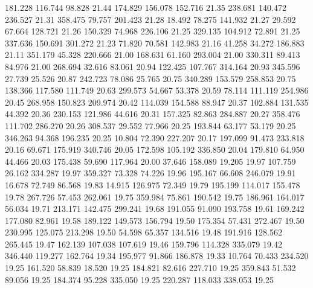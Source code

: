  181.228  116.744   98.828        21.44
 174.829  156.078  152.716        21.35
 238.681  140.472  236.527        21.31
 358.475   79.757  201.423        21.28
  18.492   78.275  141.932        21.27
  29.592   67.664  128.721        21.26
 150.329   74.968  226.106        21.25
 329.135  104.912   72.891        21.25
 337.636  150.691  301.272        21.23
  71.820   70.581  142.983        21.16
  41.258   34.272  186.883        21.11
 351.179   45.328  220.666        21.00
 168.631   61.160  293.004        21.00
 330.311   89.413   84.976        21.00
 268.694   32.616   83.061        20.94
 122.425  107.767  314.164        20.93
 345.596   27.739   25.526        20.87
 242.723   78.086   25.765        20.75
 340.289  153.579  258.853        20.75
 138.366  117.580  111.749        20.63
 299.573   54.667   53.378        20.59
  78.114  111.119  254.986        20.45
 268.958  150.823  209.974        20.42
 114.039  154.588   88.947        20.37
 102.884  131.535   44.392        20.36
 230.153  121.986   44.616        20.31
 157.325   82.863  284.887        20.27
 358.476  111.702  286.270        20.26
 308.537   29.552   77.966        20.25
 193.844   63.177   53.179        20.25
 346.263   94.368  196.235        20.25
  10.804   72.390  227.207        20.17
 197.099   91.473  233.818        20.16
  69.671  175.919  340.746        20.05
 172.598  105.192  336.850        20.04
 179.810   64.950   44.466        20.03
 175.438   59.690  117.964        20.00
  37.646  158.089   19.205        19.97
 107.759   26.162  334.287        19.97
 359.327   73.328   74.226        19.96
 195.167   66.608  246.079        19.91
  16.678   72.749   86.568        19.83
  14.915  126.975   72.349        19.79
 195.199  114.017  155.478        19.78
 267.726   57.453  262.061        19.75
 359.984   75.861  190.542        19.75
 186.961  164.017   56.034        19.71
 213.171  142.475  299.241        19.68
 191.055   91.090  193.758        19.61
 169.242  177.080   82.961        19.58
 189.122  149.573  156.794        19.50
 175.354   57.431  272.467        19.50
 230.995  125.075  213.298        19.50
  54.598   65.357  134.516        19.48
 191.916  128.562  265.445        19.47
 162.139  107.038  107.619        19.46
 159.796  114.328  335.079        19.42
 346.440  119.277  162.764        19.34
 195.977   91.866  186.878        19.33
  10.764   70.433  234.520        19.25
 161.520   58.839   18.520        19.25
 184.821   82.616  227.710        19.25
 359.843   51.532   89.056        19.25
 184.374   95.228  335.050        19.25
 220.287  118.033  338.053        19.25
